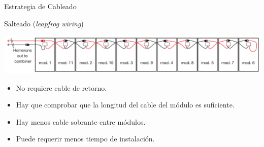 \documentclass[aspectratio=169, usenames,svgnames,dvipsnames]{beamer}
\begin{document}
\begin{frame}[label={sec:org319775f}]{Estrategia de Cableado}
\begin{block}{Salteado (\emph{leapfrog wiring})}
\begin{center}
\includegraphics[width=\textwidth]{../figs/LeapfrogWiring.png}
\end{center}

\begin{itemize}
\item No requiere cable de retorno.
\item Hay que comprobar que la longitud del cable del módulo es suficiente.
\item Hay menos cable sobrante entre módulos.
\item Puede requerir menos tiempo de instalación.
\end{itemize}
\end{block}
\end{frame}
\end{document}

